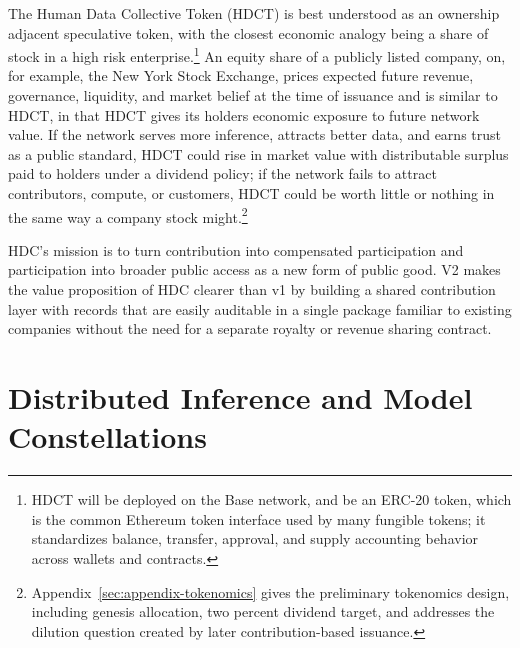 \documentclass[10pt,a4paper,twocolumn]{article}
\begin{document}
The Human Data Collective Token (HDCT) is best understood as an ownership adjacent speculative token, with the closest economic analogy being a share of stock in a high risk enterprise.\footnote{HDCT will be deployed on the Base network, and be an ERC-20 token, which is the common Ethereum token interface used by many fungible tokens; it standardizes balance, transfer, approval, and supply accounting behavior across wallets and contracts.} An equity share of a publicly listed company, on, for example, the New York Stock Exchange, prices expected future revenue, governance, liquidity, and market belief at the time of issuance and is similar to HDCT, in that HDCT gives its holders economic exposure to future network value. If the network serves more inference, attracts better data, and earns trust as a public standard, HDCT could rise in market value with distributable surplus paid to holders under a dividend policy; if the network fails to attract contributors, compute, or customers, HDCT could be worth little or nothing in the same way a company stock might.\footnote{Appendix~\ref{sec:appendix-tokenomics} gives the preliminary tokenomics design, including genesis allocation, two percent dividend target, and addresses the dilution question created by later contribution-based issuance.}

HDC's mission is to turn contribution into compensated participation and participation into broader public access as a new form of public good. V2 makes the value proposition of HDC clearer than v1 by building a shared contribution layer with records that are easily auditable in a single package familiar to existing companies without the need for a separate royalty or revenue sharing contract.

\section{Distributed Inference and Model Constellations}
\label{sec:distributed}
\end{document}
